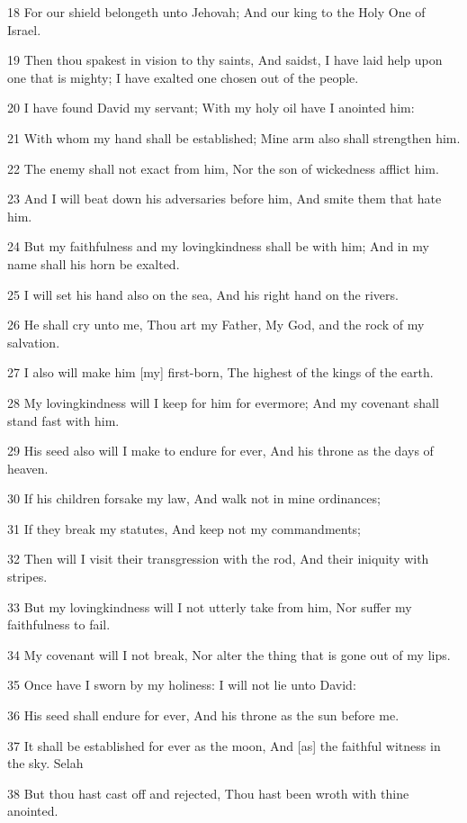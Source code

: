 \par 18 For our shield belongeth unto Jehovah; And our king to the Holy One of Israel.
\par 19 Then thou spakest in vision to thy saints, And saidst, I have laid help upon one that is mighty; I have exalted one chosen out of the people.
\par 20 I have found David my servant; With my holy oil have I anointed him:
\par 21 With whom my hand shall be established; Mine arm also shall strengthen him.
\par 22 The enemy shall not exact from him, Nor the son of wickedness afflict him.
\par 23 And I will beat down his adversaries before him, And smite them that hate him.
\par 24 But my faithfulness and my lovingkindness shall be with him; And in my name shall his horn be exalted.
\par 25 I will set his hand also on the sea, And his right hand on the rivers.
\par 26 He shall cry unto me, Thou art my Father, My God, and the rock of my salvation.
\par 27 I also will make him [my] first-born, The highest of the kings of the earth.
\par 28 My lovingkindness will I keep for him for evermore; And my covenant shall stand fast with him.
\par 29 His seed also will I make to endure for ever, And his throne as the days of heaven.
\par 30 If his children forsake my law, And walk not in mine ordinances;
\par 31 If they break my statutes, And keep not my commandments;
\par 32 Then will I visit their transgression with the rod, And their iniquity with stripes.
\par 33 But my lovingkindness will I not utterly take from him, Nor suffer my faithfulness to fail.
\par 34 My covenant will I not break, Nor alter the thing that is gone out of my lips.
\par 35 Once have I sworn by my holiness: I will not lie unto David:
\par 36 His seed shall endure for ever, And his throne as the sun before me.
\par 37 It shall be established for ever as the moon, And [as] the faithful witness in the sky. Selah
\par 38 But thou hast cast off and rejected, Thou hast been wroth with thine anointed.
